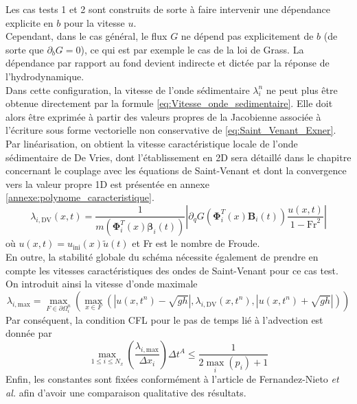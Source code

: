 \documentclass[11pt, a4paper, oneside]{report}
\begin{document}
Les cas tests 1 et 2 sont construits de sorte à faire intervenir une dépendance explicite en $b$ pour la vitesse $u$. \\
Cependant, dans le cas général, le flux $G$ ne dépend pas explicitement de $b$ (de sorte que $\partial_b G = 0$), ce qui est par exemple le cas de la loi de Grass. La dépendance par rapport au fond devient indirecte et dictée par la réponse de l'hydrodynamique. \\
Dans cette configuration, la vitesse de l'onde sédimentaire $\lambda_i^n$ ne peut plus être obtenue directement par la formule \eqref{eq:Vitesse_onde_sedimentaire}. Elle doit alors être exprimée à partir des valeurs propres de la Jacobienne associée à l'écriture sous forme vectorielle non conservative de \eqref{eq:Saint_Venant_Exner}. \\
Par linéarisation, on obtient la vitesse caractéristique locale de l'onde sédimentaire de De Vries, dont l'établissement en 2D sera détaillé dans le chapitre concernant le couplage avec les équations de Saint-Venant et dont la convergence vers la valeur propre 1D est présentée en annexe \ref{annexe:polynome_caracteristique}.
\begin{equation}
    \lambda_{i, \text{DV}}(x, t) = \frac{1}{m \left( \bm{\Phi}_i^T(x) \bm{\beta}_i(t) \right)} \left| \partial_q G \left( \bm{\Phi}_i^T(x) \bm{B}_i(t) \right) \frac{u(x, t)}{1 - \text{Fr}^2} \right|
\end{equation}
où $u(x, t) = u_\text{ini}(x) \widetilde{u}(t)$ et Fr est le nombre de Froude. \\
En outre, la stabilité globale du schéma nécessite également de prendre en compte les vitesses caractéristiques des ondes de Saint-Venant pour ce cas test. \\
On introduit ainsi la vitesse d'onde maximale
\begin{equation}
    \lambda_{i, \text{max}} = \max_{F \in \partial \Omega_i^n} \left( \max_{x \in F} \left( \left| u(x, t^n) - \sqrt{g h} \right|, \lambda_{i, \text{DV}}(x, t^n), \left| u(x, t^n) + \sqrt{g h} \right| \right) \right)
\end{equation}
Par conséquent, la condition CFL pour le pas de temps lié à l'advection est donnée par
\begin{equation}
    \max_{1 \leq i \leq N_x} \left( \frac{\lambda_{i, \text{max}}}{\Delta x_i} \right) \Delta t^A \leq \frac{1}{2 \max_i(p_i) + 1}
\end{equation}
Enfin, les constantes sont fixées conformément à l'article de Fernandez-Nieto \textit{et al.} afin d'avoir une comparaison qualitative des résultats. \\
\end{document}
